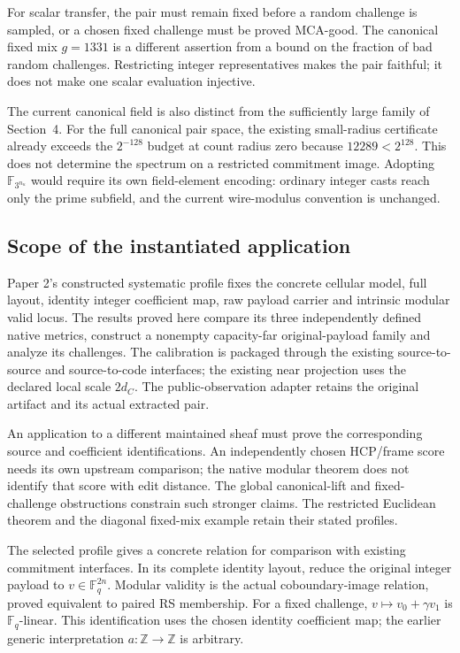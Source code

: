 For scalar transfer, the pair must remain fixed before a random challenge is
sampled, or a chosen fixed challenge must be proved MCA-good. The canonical
fixed mix \(g=1331\) is a different assertion from a bound on the fraction
of bad random challenges. Restricting integer representatives makes the
pair faithful; it does not make one scalar evaluation injective.

The current canonical field is also distinct from the sufficiently large
family of Section~4. For the full canonical pair space, the existing
small-radius certificate already exceeds the \(2^{-128}\) budget at count
radius zero because \(12289<2^{128}\). This does not determine the spectrum
on a restricted commitment image. Adopting \(\mathbb F_{3^{n_u}}\) would
require its own field-element encoding: ordinary integer casts reach only
the prime subfield, and the current wire-modulus convention is unchanged.

\subsection{Scope of the instantiated application}

Paper 2's constructed systematic profile fixes the concrete cellular model,
full layout, identity integer coefficient map, raw payload carrier and
intrinsic modular valid locus. The results proved here compare its three
independently defined native metrics, construct a nonempty capacity-far
original-payload family and analyze its challenges. The calibration is
packaged through the existing
source-to-source and source-to-code interfaces; the existing near projection
uses the declared local scale \(2d_C\). The public-observation adapter retains
the original artifact and its actual extracted pair.

An application to a different maintained sheaf must prove the corresponding
source and coefficient identifications. An independently chosen HCP/frame
score needs its own upstream comparison; the native modular theorem does not
identify that score with edit distance. The global canonical-lift and
fixed-challenge obstructions constrain such stronger claims. The restricted
Euclidean theorem and the diagonal fixed-mix example retain their stated
profiles.

The selected profile gives a concrete relation for comparison with existing
commitment interfaces. In its complete identity layout, reduce the original
integer payload to \(v\in\mathbb F_q^{2n}\). Modular validity is the actual
coboundary-image relation, proved equivalent to paired RS membership. For a
fixed challenge, \(v\mapsto v_0+\gamma v_1\) is \(\mathbb F_q\)-linear.
This identification uses the chosen identity coefficient map; the earlier
generic interpretation \(a:\mathbb Z\to\mathbb Z\) is arbitrary.


